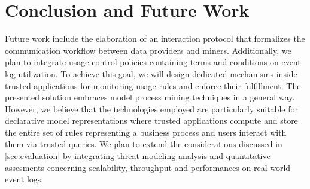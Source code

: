 \section{Conclusion and Future Work}
\label{sec:conclusion}



Future work include the elaboration of an interaction protocol that formalizes the communication workflow between data providers and miners. Additionally, we plan to integrate usage control policies containing terms and conditions on event log utilization. To achieve this goal, we will design dedicated mechanisms inside trusted applications for monitoring usage rules and enforce their fulfillment. The presented solution embraces model process mining techniques in a general way. However, we believe that the technologies employed are particularly suitable for declarative model representations where trusted applications compute and store the entire set of rules representing a business process and users interact with them via trusted queries. We plan to extend the considerations discussed in \cref{sec:evaluation} by integrating threat modeling analysis and quantitative assesments concerning scalability, throughput and performances on real-world event logs.

\begin{comment}
Limitations:
\begin{itemize}
    \item Both producer and consumer act fairly (so we do not expect to have injected data)
    \item We do not manage TEE crashes
    \item We assume a perfect communication channel (no loss, no snap, no corrupted bits)
    \item Universal clock for event timestamps (cite Event log cleaning for business process analytics by Andreas Solti)
\end{itemize} 
Future Work:
\begin{itemize}
    \item Declarative models adaptation ok
    \item Output inside the TEE, interactions through trusted applications
    \item Real-world event log data ok
    \item Usage policies integration ok
    \item Formal interaction protocol ok
    \item Threat model ok
    \item Security evaluation ok
\end{itemize}


\end{comment}